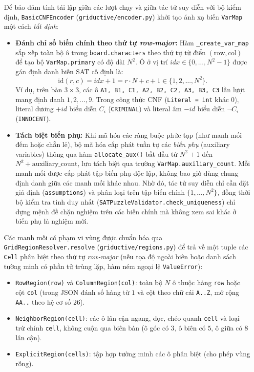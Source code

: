 \documentclass[12pt,a4paper]{article}
\begin{document}
Để bảo đảm tính tái lập giữa các lượt chạy và giữa tác tử suy diễn với bộ kiểm định, \texttt{BasicCNFEncoder} (\texttt{griductive/encoder.py}) khởi tạo ánh xạ biến \texttt{VarMap} một cách \emph{tất định}:
\begin{itemize}
    \item \textbf{Đánh chỉ số biến chính theo thứ tự \emph{row-major}:} Hàm \texttt{\_create\_var\_map} sắp xếp toàn bộ ô trong \texttt{board.characters} theo thứ tự từ điển $(\text{row}, \text{col})$ để tạo bộ \texttt{VarMap.primary} có độ dài $N^2$. Ô ở vị trí $idx \in \{0, \dots, N^2 - 1\}$ được gán định danh biến SAT cố định là:
    \[
    \text{id}(r, c) = idx + 1 = r \cdot N + c + 1 \in \{1, 2, \dots, N^2\}.
    \]
    Ví dụ, trên bàn $3 \times 3$, các ô \texttt{A1, B1, C1, A2, B2, C2, A3, B3, C3} lần lượt mang định danh $1, 2, \dots, 9$. Trong công thức CNF (\texttt{Literal = int} khác $0$), literal dương $+id$ biểu diễn $C_i$ (\texttt{CRIMINAL}) và literal âm $-id$ biểu diễn $\neg C_i$ (\texttt{INNOCENT}).

    \item \textbf{Tách biệt biến phụ:} Khi mã hóa các ràng buộc phức tạp (như manh mối đếm hoặc chẵn lẻ), bộ mã hóa cấp phát tuần tự các \emph{biến phụ} (auxiliary variables) thông qua hàm \texttt{allocate\_aux()} bắt đầu từ $N^2 + 1$ đến $N^2 + \text{auxiliary\_count}$, lưu tách biệt qua trường \texttt{VarMap.auxiliary\_count}. Mỗi manh mối được cấp phát tập biến phụ độc lập, không bao giờ dùng chung định danh giữa các manh mối khác nhau. Nhờ đó, tác tử suy diễn chỉ cần đặt giả định (\texttt{assumptions}) và phân loại trên tập biến chính $\{1, \dots, N^2\}$, đồng thời bộ kiểm tra tính duy nhất (\texttt{SATPuzzleValidator.check\_uniqueness}) chỉ dựng mệnh đề chặn nghiệm trên các biến chính mà không xem sai khác ở biến phụ là nghiệm mới.
\end{itemize}

Các manh mối có phạm vi vùng được chuẩn hóa qua \texttt{GridRegionResolver.resolve} (\texttt{griductive/regions.py}) để trả về một tuple các \texttt{Cell} phân biệt theo thứ tự \emph{row-major} (nếu tọa độ ngoài biên hoặc danh sách tường minh có phần tử trùng lặp, hàm ném ngoại lệ \texttt{ValueError}):
\begin{itemize}
    \item \texttt{RowRegion(row)} và \texttt{ColumnRegion(col)}: toàn bộ $N$ ô thuộc hàng \texttt{row} hoặc cột \texttt{col} (trong JSON đánh số hàng từ $1$ và cột theo chữ cái \texttt{A..Z}, mở rộng \texttt{AA..} theo hệ cơ số 26).
    \item \texttt{NeighborRegion(cell)}: các ô lân cận ngang, dọc, chéo quanh \texttt{cell} và loại trừ chính \texttt{cell}, không cuộn qua biên bàn (ô góc có $3$, ô biên có $5$, ô giữa có $8$ lân cận).
    \item \texttt{ExplicitRegion(cells)}: tập hợp tường minh các ô phân biệt (cho phép vùng rỗng).
\end{itemize}
\end{document}
